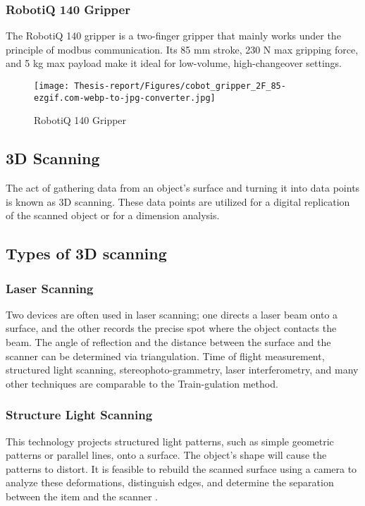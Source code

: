 \documentclass[12pt]{article}
\begin{document}
\subsubsection{RobotiQ 140 Gripper}
The RobotiQ 140 gripper is a two-finger gripper that mainly works under the principle of modbus communication. Its 85 mm stroke, 230 N max gripping force, and 5 kg max payload make it ideal for low-volume, high-changeover settings.

\begin{figure}[H]
  \centering
  \texttt{[image: Thesis-report/Figures/cobot\_gripper\_2F\_85-ezgif.com-webp-to-jpg-converter.jpg]}
  \caption{RobotiQ 140 Gripper\cite{ref26}}
  \label{fig:robotiq_140}
\end{figure}

\subsection{3D Scanning}
The act of gathering data from an object's surface and turning it into data points is known as 3D scanning. These data points are utilized for a digital replication of the scanned object or for a dimension analysis\cite{ref17}.\\

\subsection{Types of 3D scanning}

\subsubsection {Laser Scanning}
Two devices are often used in laser scanning; one directs a laser beam onto a surface, and the other records the precise spot where the object contacts the beam. The angle of reflection and the distance between the surface and the scanner can be determined via triangulation.  Time of flight measurement, structured light scanning, stereophoto-grammetry, laser interferometry, and many other techniques are comparable to the Train-gulation method\cite{ref17}.

\subsubsection {Structure Light Scanning}
This technology projects structured light patterns, such as simple geometric patterns or parallel lines, onto a surface.  The object's shape will cause the patterns to distort.  It is feasible to rebuild the scanned surface using a camera to analyze these deformations, distinguish edges, and determine the separation between the item and the scanner \cite{ref17}.
\end{document}
